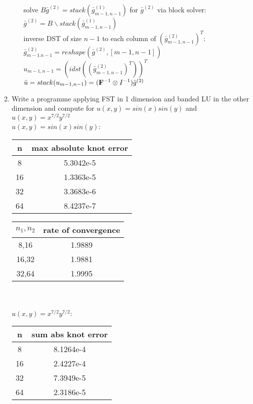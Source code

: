 \documentclass[12pt,letter]{article}
\begin{document}
\begin{enumerate}
\begin{enumerate}
    solve $B \bar{g}^{(2)} = stack(\bar{g}_{m-1,n-1}^{(1)})$ for $\bar{g}^{(2)}$ via block solver:\\
    $\bar{g}^{(2)}=B \backslash stack(\bar{g}_{m-1,n-1}^{(1)})$\\
    
    inverse DST of size $n-1$ to each column of $(\bar{g}_{m-1,n-1}^{(2)})^T$:\\
    $\bar{g}_{m-1.n-1}^{(2)}=reshape(\bar{g}^{(2)},[m-1,n-1])$\\
    $u_{m-1,n-1}=(idst((\bar{g}_{m-1,n-1}^{(2)})^T))^T$\\
    $\bar{u}=stack(u_{m-1,n-1})=(\bold{F}^{-1} \otimes I^{-1}) \bar{g}^{(2)}$\\


    \pagebreak
    
  \end{enumerate}

  \pagebreak

\item Write a programme applying FST in 1 dimension and banded LU in the other dimension and compute for $u(x,y)=sin(x)sin(y)$ and $u(x,y)=x^{7/2}y^{7/2}$\\
  
    $u(x,y)=sin(x)sin(y)$:\\
    \begin{tabular}{ |c |c |}
      \hline
      n & max absolute knot error\\
      \hline
      8 & 5.3042e-5\\
      \hline
      16 & 1.3363e-5\\
      \hline
      32 & 3.3683e-6\\
      \hline
      64 & 8.4237e-7\\
      \hline
    \end{tabular}

    \begin{tabular}{ |c |c |}
      \hline
      $n_1,n_2$ & rate of convergence\\
      \hline
      8,16 & 1.9889\\
      \hline
      16,32 & 1.9881\\
      \hline
      32,64 & 1.9995\\
      \hline
    \end{tabular}\\
    \\
    
    $u(x,y)=x^{7/2}y^{7/2}$:\\
    \begin{tabular}{ |c |c |}
      \hline
      n & sum abs knot error\\
      \hline
      8 & 8.1264e-4\\
      \hline
      16 & 2.4227e-4 \\
      \hline
      32 & 7.3949e-5\\
      \hline
      64 & 2.3186e-5\\
      \hline
    \end{tabular}


\end{enumerate}
\end{document}
